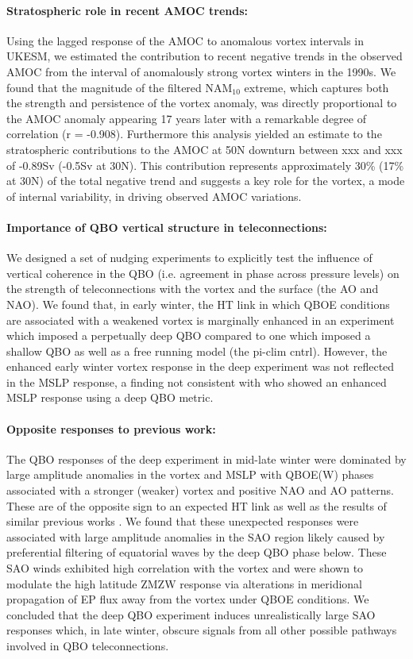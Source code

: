 \paragraph{Stratospheric role in recent AMOC trends:}
Using the lagged response of the AMOC to anomalous vortex intervals in UKESM, we estimated the contribution to recent negative trends in the observed AMOC from the interval of anomalously strong vortex winters in the 1990s. We found that the magnitude of the filtered NAM$_{10}$ extreme, which captures both the strength and persistence of the vortex anomaly, was directly proportional to the AMOC anomaly appearing 17 years later with a remarkable degree of correlation (r = -0.908). Furthermore this analysis yielded an estimate to the stratospheric contributions to the AMOC at 50N downturn between xxx and xxx of -0.89Sv (-0.5Sv at 30N). This contribution represents approximately 30\% (17\% at 30N) of the total negative trend and suggests a key role for the vortex, a mode of internal variability, in driving observed AMOC variations. 

\paragraph{Importance of QBO vertical structure in teleconnections:}
We designed a set of nudging experiments to explicitly test the influence of vertical coherence in the QBO (i.e. agreement in phase across pressure levels) on the strength of teleconnections with the vortex and the surface (the AO and NAO). We found that, in early winter, the HT link in which QBOE conditions are associated with a weakened vortex \citep{HoltonJamesRTan1980} is marginally enhanced in an experiment which imposed a perpetually deep QBO compared to one which imposed a shallow QBO as well as a free running model (the pi-clim cntrl). However, the enhanced early winter vortex response in the deep experiment was not reflected in the MSLP response, a finding not consistent with \cite{andrewsObserved2019d} who showed an enhanced MSLP response using a deep QBO metric. 

\paragraph{Opposite responses to previous work:}
The QBO responses of the deep experiment in mid-late winter were dominated by large amplitude anomalies in the vortex and MSLP with QBOE(W) phases associated with a stronger (weaker) vortex and positive NAO and AO patterns. These are of the opposite sign to an expected HT link as well as the results of similar previous works \citep{graySurface2018b, andrewsObserved2019d}. We found that these unexpected responses were associated with large amplitude anomalies in the SAO region likely caused by preferential filtering of equatorial waves by the deep QBO phase below. These SAO winds exhibited high correlation with the vortex and were shown to modulate the high latitude ZMZW response via alterations in meridional propagation of EP flux away from the vortex under QBOE conditions. We concluded that the deep QBO experiment induces unrealistically large SAO responses which, in late winter, obscure signals from all other possible pathways involved in QBO teleconnections. 


